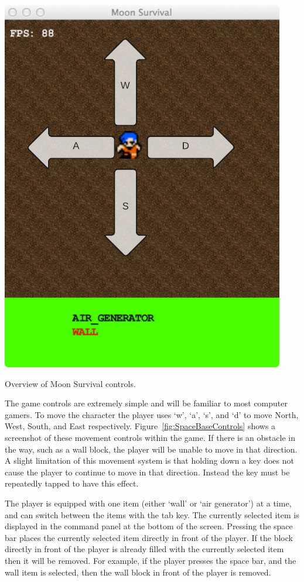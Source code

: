 \begin{marginfigure}
	\includegraphics{res/space_base_prototype/MoonSurvivalControls.pdf}
	\caption[Moon Survival controls]{Overview of Moon Survival controls.}
	\label{fig:SpaceBaseControls}
\end{marginfigure}

The game controls are extremely simple and will be familiar to most computer gamers. To move the character the player uses `w', `a', `s', and `d' to move North, West, South, and East respectively. Figure~\ref{fig:SpaceBaseControls} shows a screenshot of these movement controls within the game. If there is an obstacle in the way, such as a wall block, the player will be unable to move in that direction. A slight limitation of this movement system is that holding down a key does not cause the player to continue to move in that direction. Instead the key must be repeatedly tapped to have this effect.

The player is equipped with one item (either `wall' or `air generator') at a time, and can switch between the items with the tab key. The currently selected item is displayed in the command panel at the bottom of the screen. Pressing the space bar places the currently selected item directly in front of the player. If the block directly in front of the player is already filled with the currently selected item then it will be removed. For example, if the player presses the space bar, and the wall item is selected, then the wall block in front of the player is removed.

